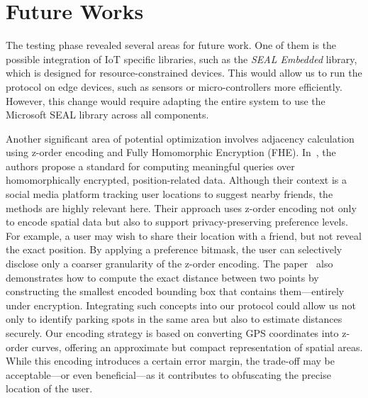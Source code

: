 \section{Future Works}

The testing phase revealed several areas for future work. One of them is the possible integration of IoT specific libraries, such as the \emph{SEAL Embedded} \cite{sealembedded} library, which is designed for resource-constrained devices. This would allow us to run the protocol on edge devices, such as sensors or micro-controllers more efficiently. However, this change would require adapting the entire system to use the Microsoft SEAL\cite{sealcrypto} library across all components.

Another significant area of potential optimization involves adjacency calculation using z-order encoding and Fully Homomorphic Encryption (FHE). In~\cite{zhang2020privacy}, the authors propose a standard for computing meaningful queries over homomorphically encrypted, position-related data. Although their context is a social media platform tracking user locations to suggest nearby friends, the methods are highly relevant here. Their approach uses z-order encoding not only to encode spatial data but also to support privacy-preserving preference levels.
For example, a user may wish to share their location with a friend, but not reveal the exact position. By applying a preference bitmask, the user can selectively disclose only a coarser granularity of the z-order encoding. The paper~\cite{zhang2020privacy} also demonstrates how to compute the exact distance between two points by constructing the smallest encoded bounding box that contains them—entirely under encryption. Integrating such concepts into our protocol could allow us not only to identify parking spots in the same area but also to estimate distances securely.
Our encoding strategy is based on converting GPS coordinates into z-order curves, offering an approximate but compact representation of spatial areas. While this encoding introduces a certain error margin, the trade-off may be acceptable—or even beneficial—as it contributes to obfuscating the precise location of the user.

